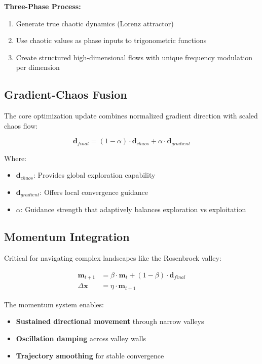\documentclass[11pt,a4paper]{article}
\begin{document}
\textbf{Three-Phase Process:}
\begin{enumerate}
\item Generate true chaotic dynamics (Lorenz attractor)
\item Use chaotic values as phase inputs to trigonometric functions
\item Create structured high-dimensional flows with unique frequency modulation per dimension
\end{enumerate}

\subsection{Gradient-Chaos Fusion}

The core optimization update combines normalized gradient direction with scaled chaos flow:

\begin{equation}
\mathbf{d}_{final} = (1 - \alpha) \cdot \mathbf{d}_{chaos} + \alpha \cdot \mathbf{d}_{gradient}
\end{equation}

Where:
\begin{itemize}
\item $\mathbf{d}_{chaos}$: Provides global exploration capability
\item $\mathbf{d}_{gradient}$: Offers local convergence guidance
\item $\alpha$: Guidance strength that adaptively balances exploration vs exploitation
\end{itemize}

\subsection{Momentum Integration}

Critical for navigating complex landscapes like the Rosenbrock valley:

\begin{align}
\mathbf{m}_{t+1} &= \beta \cdot \mathbf{m}_t + (1 - \beta) \cdot \mathbf{d}_{final} \\
\Delta\mathbf{x} &= \eta \cdot \mathbf{m}_{t+1}
\end{align}

The momentum system enables:
\begin{itemize}
\item \textbf{Sustained directional movement} through narrow valleys
\item \textbf{Oscillation damping} across valley walls
\item \textbf{Trajectory smoothing} for stable convergence
\end{itemize}
\end{document}
